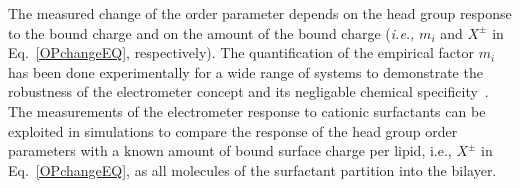 The measured change of the order parameter depends on the head group response to the bound charge 
and on the amount of the bound charge (\textit{i.e.,} $m_i$ and $X^\pm$ in Eq.~\ref{OPchangeEQ}, respectively).  
The quantification of the empirical factor $m_i$ has been done experimentally for a wide range of systems
to demonstrate the robustness of the electrometer concept and its negligable chemical specificity~\citep{seelig87, beschiasvili91}. 
The measurements of the electrometer response to cationic surfactants 
can be exploited in simulations to compare the response of the head group order parameters 
with a known amount of bound surface charge per lipid,
i.e., $X^\pm$ in Eq.~\ref{OPchangeEQ},
as all molecules of the surfactant partition into the bilayer. 


